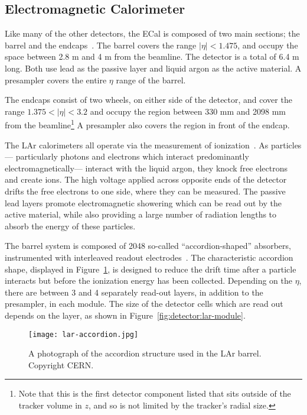 

\subsection{Electromagnetic Calorimeter}

Like many of the other detectors, the ECal is composed of two main sections; the barrel and the endcaps~\cite{ATLASPaper}. The barrel covers the range $|\eta| < 1.475$, and occupy the space between 2.8 m and 4 m from the beamline. The detector is a total of 6.4 m long. Both use lead as the passive layer and liquid argon as the active material. A presampler covers the entire $\eta$ range of the barrel.

The endcaps consist of two wheels, on either side of the detector, and cover the range $1.375 < |\eta| < 3.2$ and occupy the region between 330 mm and 2098 mm from the beamline\footnote{Note that this is the first detector component listed that sits outside of the tracker volume in $z$, and so is not limited by the tracker's radial size.} A presampler also covers the region in front of the endcap.

The LAr calorimeters all operate via the measurement of ionization~\cite{Detectors,Wigmans}. As particles--- particularly photons and electrons which interact predominantly electromagnetically--- interact with the liquid argon, they knock free electrons and create ions. The high voltage applied across opposite ends of the detector drifts the free electrons to one side, where they can be measured. The passive lead layers promote electromagnetic showering which can be read out by the active material, while also providing a large number of radiation lengths to absorb the energy of these particles.

The barrel system is composed of 2048 so-called ``accordion-shaped'' absorbers, instrumented with interleaved readout electrodes~\cite{ATLASPaper}. The characteristic accordion shape, displayed in Figure~\ref{fig:detector:lar-accordion}, is designed to reduce the drift time after a particle interacts but before the ionization energy has been collected. Depending on the $\eta$, there are between 3 and 4 separately read-out layers, in addition to the presampler, in each module. The size of the detector cells which are read out depends on the layer, as shown in Figure~\ref{fig:detector:lar-module}. 


\begin{figure}
\centering
\texttt{[image: lar-accordion.jpg]}
\label{fig:detector:lar-accordion}
\caption{A photograph of the accordion structure used in the LAr barrel. Copyright CERN.}
\end{figure}

